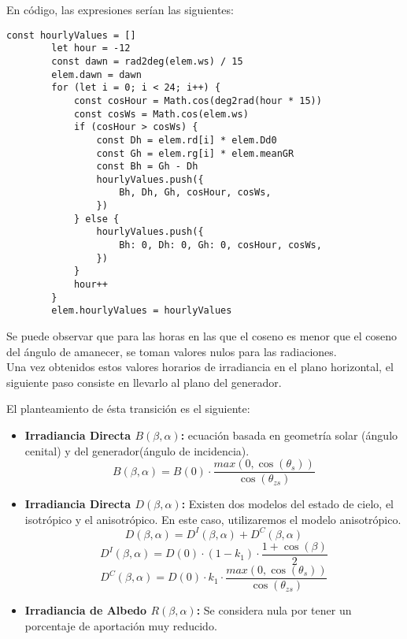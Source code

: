 En código, las expresiones serían las siguientes:

\begin{lstlisting}[style=ES6, caption={Cálculo de rG}]
		const hourlyValues = []
		let hour = -12
		const dawn = rad2deg(elem.ws) / 15
		elem.dawn = dawn
		for (let i = 0; i < 24; i++) {
			const cosHour = Math.cos(deg2rad(hour * 15))
			const cosWs = Math.cos(elem.ws)
			if (cosHour > cosWs) {
				const Dh = elem.rd[i] * elem.Dd0
				const Gh = elem.rg[i] * elem.meanGR
				const Bh = Gh - Dh
				hourlyValues.push({
					Bh, Dh, Gh, cosHour, cosWs,
				})
			} else {
				hourlyValues.push({
					Bh: 0, Dh: 0, Gh: 0, cosHour, cosWs,
				})
			}
			hour++
		}
		elem.hourlyValues = hourlyValues
\end{lstlisting}

Se puede observar que para las horas en las que el coseno es menor que el coseno del ángulo de amanecer, se toman valores nulos para las radiaciones.\\

Una vez obtenidos estos valores horarios de irradiancia en el plano horizontal, el siguiente paso consiste en llevarlo al plano del generador.

El planteamiento de ésta transición es el siguiente:
\begin{itemize}
\item \textbf{Irradiancia Directa $B(\beta,\alpha)$:} ecuación basada en geometría solar (ángulo cenital) y del generador(ángulo de incidencia).
\begin{equation}
B(\beta,\alpha) = B(0) \cdot \frac{max(0,\cos(\theta_s))}{\cos(\theta_{zs})}
\end{equation}
\item \textbf{Irradiancia Directa $D(\beta,\alpha)$:} Existen dos modelos del estado de cielo, el isotrópico y el anisotrópico. En este caso, utilizaremos el modelo anisotrópico.
\begin{equation}
D(\beta,\alpha) = D^I(\beta,\alpha)+D^C(\beta,\alpha)
\end{equation}
\begin{equation}
D^I(\beta,\alpha) = D(0)\cdot(1-k_1)\cdot\frac{1+\cos(\beta)}{2}
\end{equation}
\begin{equation}
D^C(\beta,\alpha) = D(0)\cdot k_1 \cdot \frac{max(0, \cos(\theta_s))}{\cos(\theta_{zs})}
\end{equation}
\item \textbf{Irradiancia de Albedo $R(\beta,\alpha)$:} Se considera nula por tener un porcentaje de aportación muy reducido.
\end{itemize}

